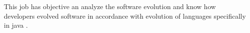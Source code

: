 This job has objective an analyze the software evolution and know how developers evolved software in accordance with evolution of languages specifically in java .